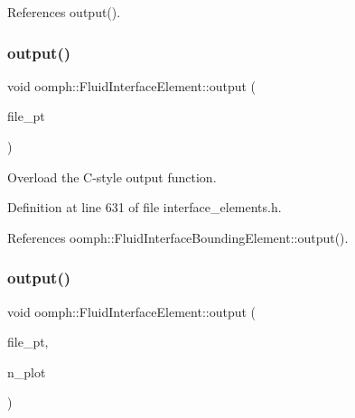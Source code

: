 References output().

\mbox{\label{classoomph_1_1FluidInterfaceElement_ad39bb9862c7f76e07d5ac006a1209cf9}} 
\subsubsection{\texorpdfstring{output()}{output()}\hspace{0.1cm}{\footnotesize\ttfamily [3/4]}}
{\footnotesize\ttfamily void oomph\+::\+Fluid\+Interface\+Element\+::output (\begin{DoxyParamCaption}\item[{F\+I\+LE $\ast$}]{file\+\_\+pt }\end{DoxyParamCaption})\hspace{0.3cm}{\ttfamily [inline]}}



Overload the C-\/style output function. 



Definition at line 631 of file interface\+\_\+elements.\+h.



References oomph\+::\+Fluid\+Interface\+Bounding\+Element\+::output().

\mbox{\label{classoomph_1_1FluidInterfaceElement_a57efd66ae07fab9e0cf98ac5f8eeb000}} 
\subsubsection{\texorpdfstring{output()}{output()}\hspace{0.1cm}{\footnotesize\ttfamily [4/4]}}
{\footnotesize\ttfamily void oomph\+::\+Fluid\+Interface\+Element\+::output (\begin{DoxyParamCaption}\item[{F\+I\+LE $\ast$}]{file\+\_\+pt,  }\item[{const unsigned \&}]{n\+\_\+plot }\end{DoxyParamCaption})}



